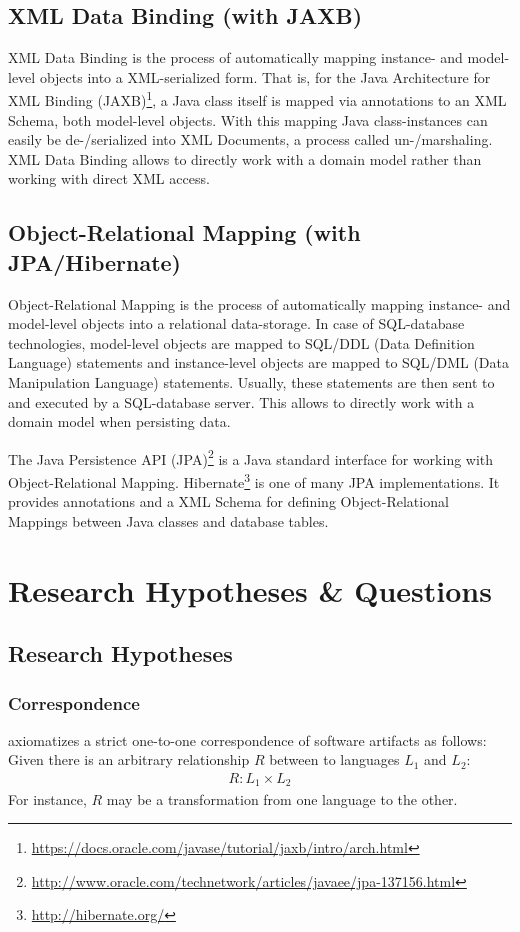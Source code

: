 \documentclass[runningheads,a4paper]{llncs}
\newcommand{\footnoteurl}[1]{\footnote{\url{#1}}}
\begin{document}
\subsection{XML Data Binding (with JAXB)}
XML Data Binding is the process of automatically mapping instance- and model-level objects into a XML-serialized form.
That is, for the Java Architecture for XML Binding (JAXB)\footnoteurl{https://docs.oracle.com/javase/tutorial/jaxb/intro/arch.html}, a Java class itself is mapped via annotations to an XML Schema, both model-level objects.
With this mapping Java class-instances can easily be de-/serialized into XML Documents, a process called un-/marshaling.
XML Data Binding allows to directly work with a domain model rather than working with direct XML access.

\subsection{Object-Relational Mapping (with JPA/Hibernate)}
Object-Relational Mapping is the process of automatically mapping instance- and model-level objects into a relational data-storage.
In case of SQL-database technologies, model-level objects are mapped to SQL/DDL (Data Definition Language) statements and instance-level objects are mapped to SQL/DML (Data Manipulation Language) statements.
Usually, these statements are then sent to and executed by a SQL-database server.
This allows to directly work with a domain model when persisting data.

The Java Persistence API (JPA)\footnoteurl{http://www.oracle.com/technetwork/articles/javaee/jpa-137156.html} is a Java standard interface for working with Object-Relational Mapping.
Hibernate\footnoteurl{http://hibernate.org/} is one of many JPA implementations.
It provides annotations and a XML Schema for defining Object-Relational Mappings between Java classes and database tables.

\section{Research Hypotheses \& Questions}
\label{section:ResearchHypthesesAndQuestions}
\subsection{Research Hypotheses}
\subsubsection{Correspondence}
\cite{DBLP:conf/sle/Lammel16} axiomatizes a strict one-to-one correspondence of software artifacts as follows:
Given there is an arbitrary relationship $R$ between to languages $L_1$ and $L_2$:
\begin{align*}
R : L_1 \times L_2
\end{align*}
For instance, $R$ may be a transformation from one language to the other.
\end{document}
